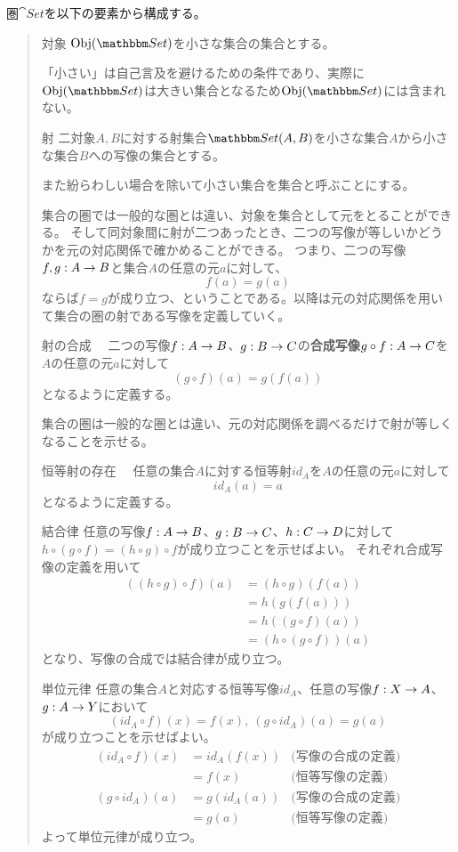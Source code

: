 	\begin{define}[集合の圏]\label{def-category-of-sets}
		圏$\cat{Set}$を以下の要素から構成する。
		\begin{quote}
			\begin{mydescription}
				\item[対象] $\obj{Set}$を小さな集合の集合とする。

				「小さい」は自己言及を避けるための条件であり、実際に$\obj{Set}$は大きい集合となるため$\obj{Set}$には含まれない。
				\item[射] 二対象$A,B$に対する射集合$\arset{Set}{A}{B}$を小さな集合$A$から小さな集合$B$への写像の集合とする。

				また紛らわしい場合を除いて小さい集合を集合と呼ぶことにする。

				集合の圏では一般的な圏とは違い、対象を集合として元をとることができる。
				そして同対象間に射が二つあったとき、二つの写像が等しいかどうかを元の対応関係で確かめることができる。
				つまり、二つの写像$f,g:A\rightarrow B$と集合$A$の任意の元$a$に対して、\[f(a)=g(a)\]ならば$f=g$が成り立つ、ということである。以降は元の対応関係を用いて集合の圏の射である写像を定義していく。

				\item[射の合成] 　二つの写像$f:A\rightarrow B$、$g:B\rightarrow C$の\textbf{合成写像}$g\circ f:A\rightarrow C$を$A$の任意の元$a$に対して\[(g\circ f)(a)=g(f(a))\]となるように定義する。

				集合の圏は一般的な圏とは違い、元の対応関係を調べるだけで射が等しくなることを示せる。
				\item[恒等射の存在]　任意の集合$A$に対する恒等射$id_A$を$A$の任意の元$a$に対して\[id_A(a)=a\]となるように定義する。
				\item[結合律] 任意の写像$f:A\rightarrow B$、$g:B\rightarrow C$、$h:C\rightarrow D$に対して$h\circ(g\circ f)=(h\circ g)\circ f$が成り立つことを示せばよい。
				それぞれ合成写像の定義を用いて
				\begin{align*}
					((h\circ g)\circ f)(a)&=(h\circ g)(f(a))\\
					&=h(g(f(a)))\\
					&=h((g\circ f)(a))\\
					&=(h\circ(g\circ f))(a)
				\end{align*}
				となり、写像の合成では結合律が成り立つ。
				\item[単位元律] 任意の集合$A$と対応する恒等写像$id_A$、任意の写像$f:X\rightarrow A$、$g:A\rightarrow Y$において\[(id_A\circ f)(x)=f(x),\ (g\circ id_A)(a)=g(a)\]が成り立つことを示せばよい。
				\begin{align*}
					(id_A\circ f)(x)&=id_A(f(x))&\text{(写像の合成の定義)}\\
					&=f(x)&\text{{(恒等写像の定義)}}\\
					(g\circ id_A)(a)&=g(id_A(a))&\text{(写像の合成の定義)}\\
					&=g(a)&\text{{(恒等写像の定義)}}
				\end{align*}
				よって単位元律が成り立つ。
			\end{mydescription}
		\end{quote}
	\end{define}
	

